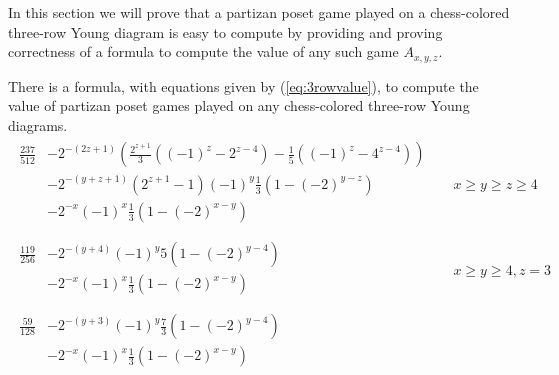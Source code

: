 In this section we will prove that a partizan poset game played on a chess-colored three-row Young diagram is easy to compute by providing and proving correctness of a formula to compute the value of any such game $A_{x,y,z}$.
\begin{thm}
\label{thm:3rowvalue}
There is a formula, with equations given by (\ref{eq:3rowvalue}), to compute the value of partizan poset games played on any chess-colored three-row Young diagrams. 
\begin{subequations}
\label{eq:3rowvalue}
\begin{align}
\label{eq:3row1}
\begin{split}
\frac{237}{512} & -2^{-(2z+1)}\left(\frac{2^{z+1}}{3}\left((-1)^z-2^{z-4}\right)-\frac{1}{5}\left((-1)^z-4^{z-4}\right)\right)\\
& -2^{-(y+z+1)}\left(2^{z+1}-1\right)(-1)^y\frac{1}{3}\left(1-(-2)^{y-z}\right)\\
& -2^{-x}(-1)^x\frac{1}{3}\left(1-(-2)^{x-y}\right)\\
\end{split}%
&&x\ge y\ge z\ge4
\\
\label{eq:3row2}
\begin{split}
\frac{119}{256}&-2^{-(y+4)}(-1)^y5\left(1-(-2)^{y-4}\right)\\
& -2^{-x}(-1)^x\frac{1}{3}\left(1-(-2)^{x-y}\right)\\
\end{split}
&&x\ge y\ge 4,z=3
\\
\label{eq:3row3}
\begin{split}
\frac{59}{128}&-2^{-(y+3)}(-1)^y\frac{7}{3}\left(1-(-2)^{y-4}\right)\\
& -2^{-x}(-1)^x\frac{1}{3}\left(1-(-2)^{x-y}\right)\\

\end{split}
\end{align}
\end{subequations}
\end{thm}
